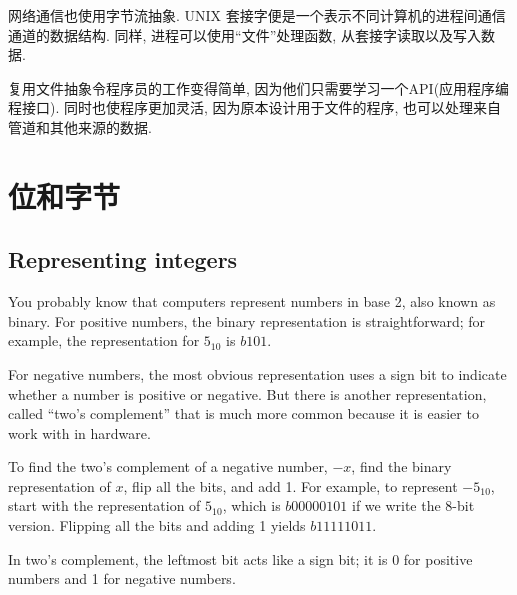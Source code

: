 \documentclass[12pt]{book}
\begin{document}
{%
网络通信也使用字节流抽象. UNIX 套接字便是一个表示不同计算机的进程间通信通道的数据结构.
同样, 进程可以使用``文件''处理函数, 从套接字读取以及写入数据.

复用文件抽象令程序员的工作变得简单, 因为他们只需要学习一个API(应用程序编程接口).
同时也使程序更加灵活, 因为原本设计用于文件的程序, 也可以处理来自管道和其他来源的数据.



\chapter{位和字节}

\section{Representing integers}

You probably know that computers represent numbers in
base 2, also known as binary.  For positive numbers, the binary
representation is straightforward; for example, the representation
for $5_{10}$ is $b101$.

For negative numbers, the most obvious representation uses
a sign bit to indicate whether a number is positive or negative.
But there is another representation, called ``two's complement''
that is much more common because it is easier to work with
in hardware.

To find the two's complement of a negative number, $-x$, find
the binary representation of $x$, flip all the bits, and add 1.
For example, to represent $-5_{10}$, start with the representation
of $5_{10}$, which is $b0000 0101$ if we write the 8-bit version.
Flipping all the bits and adding 1 yields $b1111 1011$.

In two's complement, the leftmost bit acts like a sign bit;
it is 0 for positive numbers and 1 for negative numbers.

}
\end{document}
